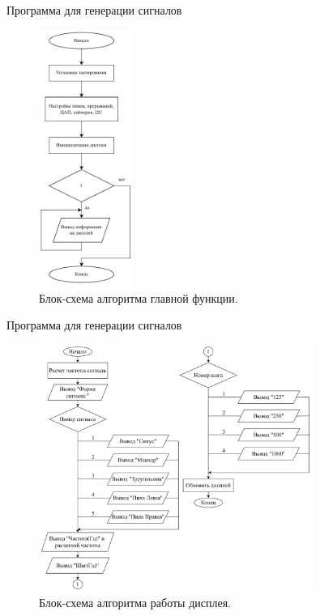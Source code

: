 \documentclass[10pt]{beamer}
\begin{document}
\begin{frame}{Программа для генерации сигналов}
  \begin{figure}
  \includegraphics[width=0.275\textwidth]{main}
  \caption{Блок-схема алгоритма главной функции.}
  \end{figure}
\end{frame}

\begin{frame}{Программа для генерации сигналов}
  \begin{figure}
  \includegraphics[width=0.8\textwidth]{display}
  \caption{Блок-схема алгоритма работы дисплея.}
  \end{figure}
\end{frame}
\end{document}

